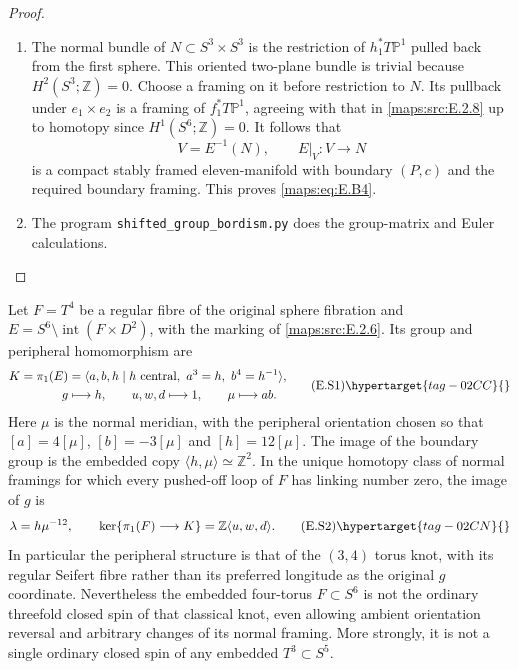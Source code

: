 \begin{proof}
\begin{enumerate}[label={$\langle1\rangle$\arabic*.},leftmargin=*]
\item The normal bundle of $N\subset S^3\times S^3$ is the
restriction of $h_1^*T\mathbb P^1$ pulled back from the first
sphere. This oriented two-plane bundle is trivial because
$H^2(S^3;\mathbb Z)=0$. Choose a framing on it before
restriction to $N$. Its pullback under $e_1\times e_2$
is a framing of $f_1^*T\mathbb P^1$, agreeing with that
in \ref{maps:src:E.2.8} up to homotopy since $H^1(S^6;\mathbb Z)=0$.
It follows that
\[
                  V=E^{-1}(N),\qquad E|_V:V\longrightarrow N
\]
is a compact stably framed eleven-manifold with boundary
$(P,c)$ and the required boundary framing. This proves \eqref{maps:eq:E.B4}.

\item The program \texttt{shifted\_group\_bordism.py} does the group-matrix and Euler calculations.
\end{enumerate}
\end{proof}


\begin{proposition}\hypertarget{tag-02MA}{}\label{maps:src:E.2.10}


Let $F=T^4$ be a regular fibre of the original sphere fibration and
$E=S^6\setminus\operatorname{int}(F\times D^2)$, with the marking of
\ref{maps:src:E.2.6}. Its group and peripheral homomorphism are
\[
 \begin{split}
 K=\pi_1(E)&=\langle a,b,h\mid h\text{ central},\ a^3=h,
                                      \ b^4=h^{-1}\rangle,\\
 g&\longmapsto h,\qquad u,w,d\longmapsto1,
       \qquad \mu\longmapsto ab.
 \end{split}
 \tag{E.S1}\hypertarget{tag-02CC}{}\label{maps:eq:E.S1}
\]
Here $\mu$ is the normal meridian, with the peripheral orientation
chosen so that $[a]=4[\mu]$, $[b]=-3[\mu]$ and $[h]=12[\mu]$.
The image of the boundary group is the embedded copy
$\langle h,\mu\rangle\simeq\mathbb Z^2$. In the unique homotopy
class of normal framings for which every pushed-off loop of $F$
has linking number zero, the image of $g$ is
\[
             \lambda=h\mu^{-12},
 \qquad \ker\{\pi_1(F)\longrightarrow K\}
                 =\mathbb Z\langle u,w,d\rangle.
 \tag{E.S2}\hypertarget{tag-02CN}{}\label{maps:eq:E.S2}
\]
In particular the peripheral structure is that of the $(3,4)$
torus knot, with its regular Seifert fibre rather than its preferred
longitude as the original $g$ coordinate. Nevertheless the embedded
four-torus $F\subset S^6$ is not the ordinary threefold closed spin
of that classical knot, even allowing ambient orientation reversal
and arbitrary changes of its normal framing. More strongly, it is
not a single ordinary closed spin of any embedded $T^3\subset S^5$.

\end{proposition}


